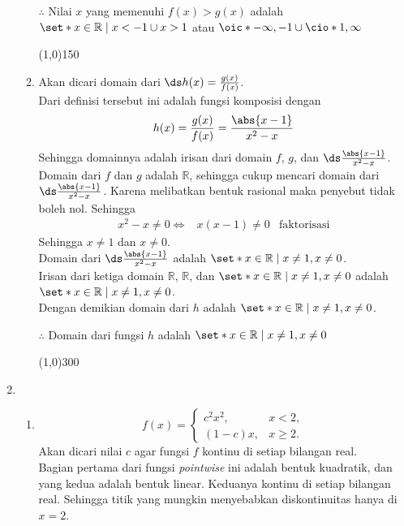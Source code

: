 \begin{enumerate}[leftmargin=*, label={\arabic*}.]
\begin{enumerate}[label={\alph*}.]
$\therefore$ Nilai $x$ yang memenuhi $f(x) > g(x)$ adalah
$\set*{x \in \mathbb{R} \mid x < -1 \cup x > 1}$
atau $\oic*{-\infty, -1} \cup \cio*{1, \infty}$

\begin{center}
    \line(1,0){150}
\end{center}
\item Akan dicari domain dari $\ds h(x) = \frac{g(x)}{f(x)}$.\\
Dari definisi tersebut ini adalah fungsi komposisi dengan 
\[
    h(x) = \frac{g(x)}{f(x)} = \frac{\abs{x-1}}{x^{2}-x}
\]
Sehingga domainnya adalah irisan dari domain $f$, $g$, dan 
$\ds \frac{\abs{x-1}}{x^{2}-x}$.\\
Domain dari $f$ dan $g$ adalah $\mathbb{R}$, sehingga cukup mencari 
domain dari $\ds \frac{\abs{x-1}}{x^{2}-x}$. Karena melibatkan 
bentuk rasional maka penyebut tidak boleh nol. Sehingga
\begin{align*}
    x^{2}-x \neq 0 \iff &x(x-1)\neq 0
    &\text{faktorisasi}
\end{align*}
Sehingga $x \neq 1$ dan $x \neq 0$. \\Domain dari 
$\ds \frac{\abs{x-1}}{x^{2}-x}$ adalah 
$\set*{x \in \mathbb{R} \mid x \neq 1, x\neq 0}$.\\ Irisan dari ketiga domain
$\mathbb{R}$, $\mathbb{R}$, dan $\set*{x \in \mathbb{R} \mid x \neq 1, x\neq 0}$ 
adalah $\set*{x \in \mathbb{R} \mid x \neq 1, x\neq 0}$.\\
Dengan demikian domain dari $h$ adalah 
$\set*{x \in \mathbb{R} \mid x \neq 1, x\neq 0}$.

$\therefore$ Domain dari fungsi $h$ adalah 
$\set*{x \in \mathbb{R} \mid x \neq 1, x\neq 0}$

\begin{center}
    \line(1,0){300}
\end{center}
\end{enumerate}
\item
\begin{enumerate}[label={\alph*}.]
\item \[
f(x) = 
\begin{cases}
    c^{2}x^{2}, &{x < 2},\\
    (1-c)x, &{x \geq 2}.
\end{cases}
\]
Akan dicari nilai $c$ agar fungsi $f$ kontinu di setiap bilangan real.\\
Bagian pertama dari fungsi \textit{pointwise} ini adalah bentuk kuadratik, 
dan yang kedua adalah bentuk linear. Keduanya kontinu di setiap bilangan real. 
Sehingga titik yang mungkin menyebabkan diskontinuitas hanya di $x=2$.


\end{enumerate}
\end{enumerate}
